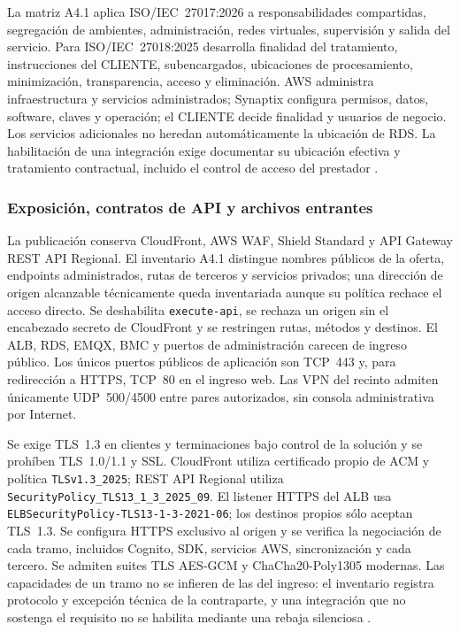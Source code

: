 La matriz A4.1 aplica ISO/IEC~27017:2026 a responsabilidades compartidas, segregación de ambientes, administración, redes virtuales, supervisión y salida del servicio. Para ISO/IEC~27018:2025 desarrolla finalidad del tratamiento, instrucciones del CLIENTE, subencargados, ubicaciones de procesamiento, minimización, transparencia, acceso y eliminación. AWS administra infraestructura y servicios administrados; Synaptix configura permisos, datos, software, claves y operación; el CLIENTE decide finalidad y usuarios de negocio. Los servicios adicionales no heredan automáticamente la ubicación de RDS. La habilitación de una integración exige documentar su ubicación efectiva y tratamiento contractual, incluido el control de acceso del prestador \parencites{sec-iso27017-actual,sec-iso27018-actual}.

\subsubsection{Exposición, contratos de API y archivos entrantes}
\label{sec:4-exposicion-rt}

La publicación conserva CloudFront, AWS WAF, Shield Standard y API Gateway REST API Regional. El inventario A4.1 distingue nombres públicos de la oferta, endpoints administrados, rutas de terceros y servicios privados; una dirección de origen alcanzable técnicamente queda inventariada aunque su política rechace el acceso directo. Se deshabilita \texttt{execute-api}, se rechaza un origen sin el encabezado secreto de CloudFront y se restringen rutas, métodos y destinos. El ALB, RDS, EMQX, BMC y puertos de administración carecen de ingreso público. Los únicos puertos públicos de aplicación son TCP~443 y, para redirección a HTTPS, TCP~80 en el ingreso web. Las VPN del recinto admiten únicamente UDP~500/4500 entre pares autorizados, sin consola administrativa por Internet.

Se exige TLS~1.3 en clientes y terminaciones bajo control de la solución y se prohíben TLS~1.0/1.1 y SSL. CloudFront utiliza certificado propio de ACM y política \texttt{TLSv1.3\_2025}; REST API Regional utiliza \texttt{SecurityPolicy\_TLS13\_1\_3\_2025\_09}. El listener HTTPS del ALB usa \texttt{ELBSecurityPolicy-TLS13-1-3-2021-06}; los destinos propios sólo aceptan TLS~1.3. Se configura HTTPS exclusivo al origen y se verifica la negociación de cada tramo, incluidos Cognito, SDK, servicios AWS, sincronización y cada tercero. Se admiten suites TLS AES-GCM y ChaCha20-Poly1305 modernas. Las capacidades de un tramo no se infieren de las del ingreso: el inventario registra protocolo y excepción técnica de la contraparte, y una integración que no sostenga el requisito no se habilita mediante una rebaja silenciosa \parencites{sec-cloudfront-tls,sec-api-tls,sec-alb-tls}.


